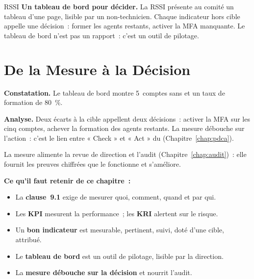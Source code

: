 \begin{boxmetier}{RSSI}
\textbf{Un tableau de bord pour décider.} La RSSI présente au comité un tableau
d'une page, lisible par un non-technicien. Chaque indicateur hors cible
appelle une décision~: former les agents restants, activer la MFA manquante.
Le tableau de bord n'est pas un rapport~: c'est un outil de pilotage.
\end{boxmetier}

\section{De la Mesure à la Décision}
\label{sec:c18-decision}

\begin{boxprocedure}
\textbf{Constatation.} Le tableau de bord montre 5~comptes sans  et
un taux de formation de 80~\%.

\medskip
\textbf{Analyse.} Deux écarts à la cible appellent deux décisions~: activer la
MFA sur les cinq comptes, achever la formation des agents restants. La mesure
débouche sur l'action~: c'est le lien entre « Check » et « Act » du
 (Chapitre~\ref{chap:pdca}).
\end{boxprocedure}

La mesure alimente la revue de direction et l'audit (Chapitre~\ref{chap:audit})~:
elle fournit les preuves chiffrées que le  fonctionne et s'améliore.

\separateur

\begin{boxresume}
\textbf{Ce qu'il faut retenir de ce chapitre~:}
\begin{itemize}
    \item La \textbf{clause~9.1} exige de mesurer quoi, comment, quand et par
          qui.
    \item Les \textbf{KPI} mesurent la performance~; les \textbf{KRI} alertent
          sur le risque.
    \item Un \textbf{bon indicateur} est mesurable, pertinent, suivi, doté
          d'une cible, attribué.
    \item Le \textbf{tableau de bord} est un outil de pilotage, lisible par la
          direction.
    \item La \textbf{mesure débouche sur la décision} et nourrit l'audit.
\end{itemize}
\end{boxresume}


